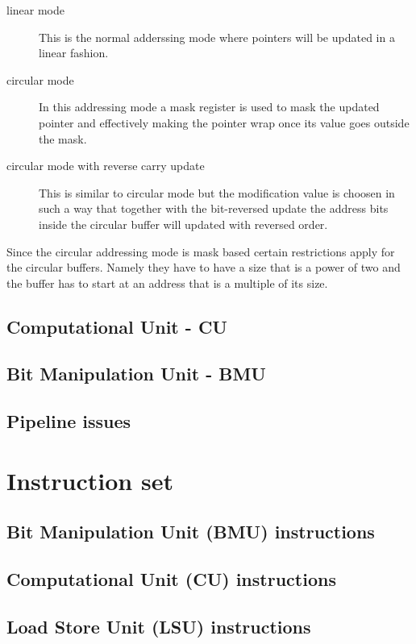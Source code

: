\documentclass[11pt]{book}
\begin{document}
\begin{description}
  \item[linear mode] This is the normal adderssing mode where pointers
    will be updated in a linear fashion.
  \item[circular mode] In this addressing mode a mask register is used
    to mask the updated pointer and effectively making the pointer
    wrap once its value goes outside the mask.
  \item[circular mode with reverse carry update] This is similar to
    circular mode but the modification value is choosen in such a way
    that together with the bit-reversed update the address bits inside
    the circular buffer will updated with reversed order.
\end{description}

Since the circular addressing mode is mask based certain restrictions
apply for the circular buffers. Namely they have to have a size that
is a power of two and the buffer has to start at an address that is a
multiple of its size.




\section{Computational Unit - CU}

\section{Bit Manipulation Unit - BMU}

\section{Pipeline issues}

\newpage
\chapter{Instruction set}
\newpage
\section{Bit Manipulation Unit (BMU) instructions}

\newpage
\section{Computational Unit (CU) instructions}

\newpage
\section{Load Store Unit (LSU) instructions}

\end{document}
